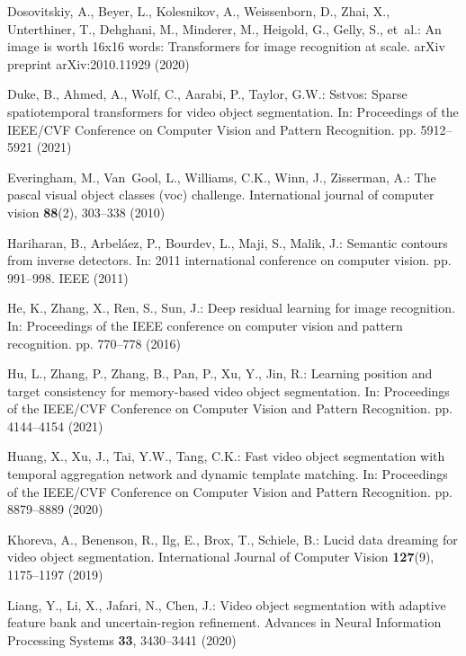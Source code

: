 \documentclass[runningheads]{llncs}
\begin{document}
\begin{thebibliography}{10}
Dosovitskiy, A., Beyer, L., Kolesnikov, A., Weissenborn, D., Zhai, X.,
  Unterthiner, T., Dehghani, M., Minderer, M., Heigold, G., Gelly, S., et~al.:
  An image is worth 16x16 words: Transformers for image recognition at scale.
  arXiv preprint arXiv:2010.11929  (2020)

Duke, B., Ahmed, A., Wolf, C., Aarabi, P., Taylor, G.W.: Sstvos: Sparse
  spatiotemporal transformers for video object segmentation. In: Proceedings of
  the IEEE/CVF Conference on Computer Vision and Pattern Recognition. pp.
  5912--5921 (2021)

Everingham, M., Van~Gool, L., Williams, C.K., Winn, J., Zisserman, A.: The
  pascal visual object classes (voc) challenge. International journal of
  computer vision  \textbf{88}(2),  303--338 (2010)

Hariharan, B., Arbel{\'a}ez, P., Bourdev, L., Maji, S., Malik, J.: Semantic
  contours from inverse detectors. In: 2011 international conference on
  computer vision. pp. 991--998. IEEE (2011)

He, K., Zhang, X., Ren, S., Sun, J.: Deep residual learning for image
  recognition. In: Proceedings of the IEEE conference on computer vision and
  pattern recognition. pp. 770--778 (2016)

Hu, L., Zhang, P., Zhang, B., Pan, P., Xu, Y., Jin, R.: Learning position and
  target consistency for memory-based video object segmentation. In:
  Proceedings of the IEEE/CVF Conference on Computer Vision and Pattern
  Recognition. pp. 4144--4154 (2021)

Huang, X., Xu, J., Tai, Y.W., Tang, C.K.: Fast video object segmentation with
  temporal aggregation network and dynamic template matching. In: Proceedings
  of the IEEE/CVF Conference on Computer Vision and Pattern Recognition. pp.
  8879--8889 (2020)

Khoreva, A., Benenson, R., Ilg, E., Brox, T., Schiele, B.: Lucid data dreaming
  for video object segmentation. International Journal of Computer Vision
  \textbf{127}(9),  1175--1197 (2019)

Liang, Y., Li, X., Jafari, N., Chen, J.: Video object segmentation with
  adaptive feature bank and uncertain-region refinement. Advances in Neural
  Information Processing Systems  \textbf{33},  3430--3441 (2020)


\end{thebibliography}
\end{document}
